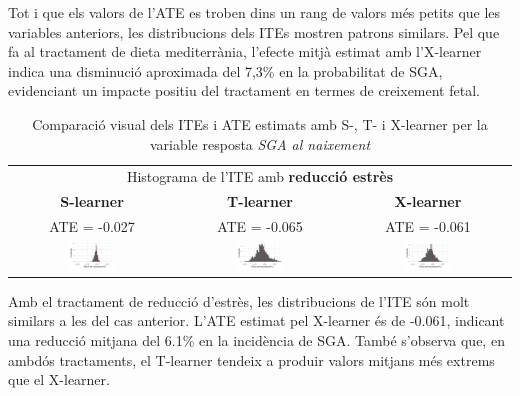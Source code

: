 \documentclass[../main.tex]{subfiles}
\begin{document}
    Tot i que els valors de l’ATE es troben dins un rang de valors més petits que les variables anteriors, les distribucions dels ITEs mostren patrons similars. Pel que fa al tractament de dieta mediterrània, l’efecte mitjà estimat amb l’X-learner indica una disminució aproximada del 7,3\% en la probabilitat de SGA, evidenciant un impacte positiu del tractament en termes de creixement fetal.


    \begin{table}[H]
        \centering
        \begin{tabular}{ccc}
        \multicolumn{3}{c}{Histograma de l'ITE amb \textbf{reducció estrès}} \\
        \small \textbf{S-learner} & \small \textbf{T-learner} & \small \textbf{X-learner} \\
        \footnotesize ATE = -0.027 & \footnotesize ATE = -0.065 & \footnotesize ATE = -0.061 \\
        \includegraphics[width=0.3\textwidth]{imgs/histogrames/hist(SGA_birth_hard_imput)S_tract3.jpg} &
        \includegraphics[width=0.3\textwidth]{imgs/histogrames/hist(SGA_birth_hard_imput)T_tract3.jpg} &
        \includegraphics[width=0.3\textwidth]{imgs/histogrames/hist(SGA_birth_hard_imput)X_tract3.jpg} \\
        \end{tabular}
        \caption{\footnotesize Comparació visual dels ITEs i ATE estimats amb S-, T- i X-learner per la variable resposta \textit{SGA al naixement}}
        \label{tab:histITE_SGAneix3}
    \end{table}

    Amb el tractament de reducció d'estrès, les distribucions de l’ITE són molt similars a les del cas anterior. L’ATE estimat pel X-learner és de -0.061, indicant una reducció mitjana del 6.1\% en la incidència de SGA. També s’observa que, en ambdós tractaments, el T-learner tendeix a produir valors mitjans més extrems que el X-learner.
\end{document}
